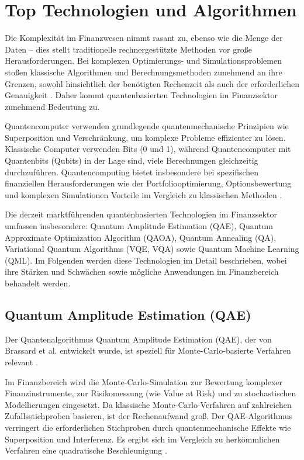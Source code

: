 \section{Top Technologien und Algorithmen}

Die Komplexität im Finanzwesen nimmt rasant zu, ebenso wie die Menge der Daten – dies stellt traditionelle rechnergestützte Methoden vor große Herausforderungen. Bei komplexen Optimierungs- und Simulationsproblemen stoßen klassische Algorithmen und Berechnungsmethoden zunehmend an ihre Grenzen, sowohl hinsichtlich der benötigten Rechenzeit als auch der erforderlichen Genauigkeit \cite{plos2024,bouland2020}. Daher kommt quantenbasierten Technologien im Finanzsektor zunehmend Bedeutung zu.

Quantencomputer verwenden grundlegende quantenmechanische Prinzipien wie Superposition und Verschränkung, um komplexe Probleme effizienter zu lösen. Klassische Computer verwenden Bits (0 und 1), während Quantencomputer mit Quantenbits (Qubits) in der Lage sind, viele Berechnungen gleichzeitig durchzuführen. Quantencomputing bietet insbesondere bei spezifischen finanziellen Herausforderungen wie der Portfoliooptimierung, Optionsbewertung und komplexen Simulationen Vorteile im Vergleich zu klassischen Methoden \cite{orus2019,bouland2020,martin2022}.

Die derzeit marktführenden quantenbasierten Technologien im Finanzsektor umfassen insbesondere:
Quantum Amplitude Estimation (QAE), Quantum Approximate Optimization Algorithm (QAOA), Quantum Annealing (QA), Variational Quantum Algorithms (VQE, VQA) sowie Quantum Machine Learning (QML). Im Folgenden werden diese Technologien im Detail beschrieben, wobei ihre Stärken und Schwächen sowie mögliche Anwendungen im Finanzbereich behandelt werden.

\subsection{Quantum Amplitude Estimation (QAE)}

Der Quantenalgorithmus Quantum Amplitude Estimation (QAE), der von Brassard et al. entwickelt wurde, ist speziell für Monte-Carlo-basierte Verfahren relevant \cite{quantumjournal2020,rebentrost2018}.

Im Finanzbereich wird die Monte-Carlo-Simulation zur Bewertung komplexer Finanzinstrumente, zur Risikomessung (wie Value at Risk) und zu stochastischen Modellierungen eingesetzt. Da klassische Monte-Carlo-Verfahren auf zahlreichen Zufallsstichproben basieren, ist der Rechenaufwand groß. Der QAE-Algorithmus verringert die erforderlichen Stichproben durch quantenmechanische Effekte wie Superposition und Interferenz. Es ergibt sich im Vergleich zu herkömmlichen Verfahren eine quadratische Beschleunigung \cite{quantumjournal2020,rebentrost2018,martin2022}.

